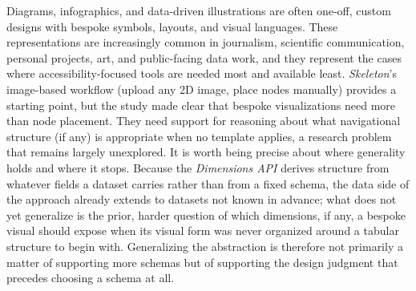 \documentclass[12pt]{cmuthesis}
\begin{document}

Diagrams, infographics, and data-driven illustrations are often one-off, custom designs with bespoke symbols, layouts, and visual languages. These representations are increasingly common in journalism, scientific communication, personal projects, art, and public-facing data work, and they represent the cases where accessibility-focused tools are needed most and available least. \textit{Skeleton}'s image-based workflow (upload any 2D image, place nodes manually) provides a starting point, but the study made clear that bespoke visualizations need more than node placement. They need support for reasoning about what navigational structure (if any) is appropriate when no template applies, a research problem that remains largely unexplored. It is worth being precise about where generality holds and where it stops. Because the \textit{Dimensions API} derives structure from whatever fields a dataset carries rather than from a fixed schema, the data side of the approach already extends to datasets not known in advance; what does not yet generalize is the prior, harder question of which dimensions, if any, a bespoke visual should expose when its visual form was never organized around a tabular structure to begin with. Generalizing the abstraction is therefore not primarily a matter of supporting more schemas but of supporting the design judgment that precedes choosing a schema at all.
\end{document}

